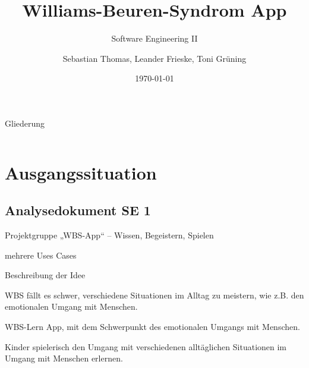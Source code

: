 \documentclass[10pt,fleqn]{beamer}
\title[WBS]{Williams-Beuren-Syndrom App}
\subtitle[]{Software Engineering II}
\date{\today}
\author{Sebastian Thomas, Leander Frieske, Toni Grüning}
\begin{document}

\begin{frame}
	\titlepage
\end{frame}

\begin{frame}{Gliederung}
 	\begin{columns}
   		\begin{column}{10.0cm}
		    \renewcommand{\baselinestretch}{1.5}
		    \normalsize
		    \tableofcontents
		    \renewcommand{\baselinestretch}{1.0}
		    \normalsize
	   	\end{column}
	   	\hspace*{-1.3cm}
	\end{columns}
\end{frame}


\section{Ausgangssituation}


\subsection{Analysedokument SE 1}
\begin{frame}[t]{Projektgruppe}
„WBS-App“ – Wissen, Begeistern, Spielen

mehrere Uses Cases

Beschreibung der Idee

WBS fällt es schwer, verschiedene Situationen im Alltag zu meistern,
wie z.B. den emotionalen Umgang mit Menschen.

WBS-Lern App, mit dem
Schwerpunkt des emotionalen Umgangs mit Menschen.

Kinder spielerisch den Umgang mit verschiedenen alltäglichen Situationen im Umgang
mit Menschen erlernen.
\end{frame} 
\end{document}
